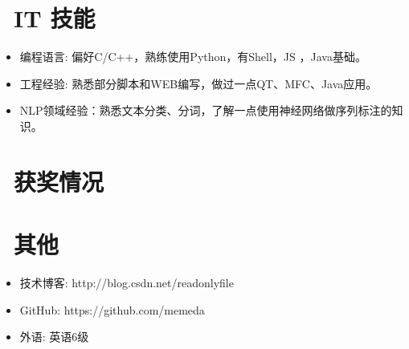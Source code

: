 \documentclass{resume}
\begin{document}

\section{\faCogs\ IT 技能}
\begin{itemize}[parsep=0.5ex]
  \item 编程语言: 偏好C/C++，熟练使用Python，有Shell，JS ，Java基础。
  \item 工程经验: 熟悉部分脚本和WEB编写，做过一点QT、MFC、Java应用。
  \item NLP领域经验：熟悉文本分类、分词，了解一点使用神经网络做序列标注的知识。
\end{itemize}

\section{\faHeartO\ 获奖情况}

\section{\faInfo\ 其他}
\begin{itemize}[parsep=0.5ex]
  \item 技术博客: http://blog.csdn.net/readonlyfile
  \item GitHub: https://github.com/memeda
  \item 外语: 英语6级
\end{itemize}

%
%
\end{document}
